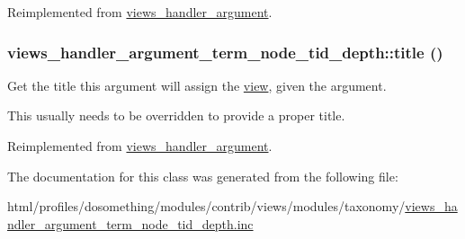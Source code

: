 Reimplemented from \hyperlink{classviews__handler__argument_a06263489052be463efd3c4afdf73851d}{views\_\-handler\_\-argument}.\hypertarget{classviews__handler__argument__term__node__tid__depth_ad5a2ca190b4b164a810f84f808faa586}{
\subsubsection[{title}]{\setlength{\rightskip}{0pt plus 5cm}views\_\-handler\_\-argument\_\-term\_\-node\_\-tid\_\-depth::title ()}}
\label{classviews__handler__argument__term__node__tid__depth_ad5a2ca190b4b164a810f84f808faa586}
Get the title this argument will assign the \hyperlink{classview}{view}, given the argument.

This usually needs to be overridden to provide a proper title. 

Reimplemented from \hyperlink{classviews__handler__argument_a76181ac24e7be4a09aaafc1fa5f15ea1}{views\_\-handler\_\-argument}.

The documentation for this class was generated from the following file:\begin{DoxyCompactItemize}
\item 
html/profiles/dosomething/modules/contrib/views/modules/taxonomy/\hyperlink{views__handler__argument__term__node__tid__depth_8inc}{views\_\-handler\_\-argument\_\-term\_\-node\_\-tid\_\-depth.inc}\end{DoxyCompactItemize}

